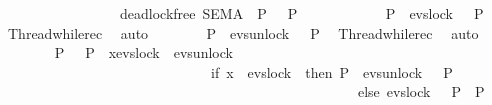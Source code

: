 \begin{isabellebody}
\ \ \ \ \ \ \ \ \ \ \ \ \ \ \ \ {\isacharparenleft}{\kern0pt}\ {\isacartoucheopen}deadlock{\isacharunderscore}{\kern0pt}free\ {\isacharparenleft}{\kern0pt}{\isacharquery}{\kern0pt}SEMA\ {\isacharbar}{\kern0pt}{\isacharbar}{\kern0pt}\ {\isacharparenleft}{\kern0pt}{\isacharquery}{\kern0pt}P{}\ \ {\isacharbar}{\kern0pt}{\isacharbar}{\kern0pt}{\isacharbar}{\kern0pt}\ {\isacharquery}{\kern0pt}P{}{\isacharparenright}{\kern0pt}{\isacharparenright}{\kern0pt}{\isacartoucheclose}{\isacharparenright}{\kern0pt}\isanewline
\ \ \isamarkupfalse%
\ {\isacharminus}{\kern0pt}\isanewline
\ \ \ \ \isamarkupfalse%
\ {}\ {\isacharcolon}{\kern0pt}\ {\isacartoucheopen}{\isacharquery}{\kern0pt}P{}\ {\isacharequal}{\kern0pt}\ evs{\isachardot}{\kern0pt}lock\ {}\ {\isasymrightarrow}\ {\isacharquery}{\kern0pt}P{}{\isacartoucheclose}\ \isamarkupfalse%
\ Thread{}{\isacharunderscore}{\kern0pt}while{\isacharunderscore}{\kern0pt}rec\ \isamarkupfalse%
\ auto\isanewline
\ \ \ \ \isamarkupfalse%
\ {}\ {\isacharcolon}{\kern0pt}\ {\isacartoucheopen}{\isacharquery}{\kern0pt}P{}\ {\isacharequal}{\kern0pt}\ evs{\isachardot}{\kern0pt}unlock\ {}\ {\isasymrightarrow}\ {\isacharquery}{\kern0pt}P{}{\isacartoucheclose}\ \isamarkupfalse%
\ Thread{}{\isacharunderscore}{\kern0pt}while{\isacharunderscore}{\kern0pt}rec\ \isamarkupfalse%
\ auto\isanewline
\ \ \ \ \isamarkupfalse%
\ {}\ {\isacharcolon}{\kern0pt}\ {\isacartoucheopen}{\isacharquery}{\kern0pt}P{}\ \ {\isacharbar}{\kern0pt}{\isacharbar}{\kern0pt}{\isacharbar}{\kern0pt}\ {\isacharquery}{\kern0pt}P{}\ {\isacharequal}{\kern0pt}\ {\isasymbox}x{\isasymin}{\isacharbraceleft}{\kern0pt}evs{\isachardot}{\kern0pt}lock\ {}{\isacharcomma}{\kern0pt}\ evs{\isachardot}{\kern0pt}unlock\ {}{\isacharbraceright}{\kern0pt}\isanewline
\ \ \ \ \ \ \ \ \ \ \ \ \ \ \ \ \ \ \ \ \ \ \ \ \ \ \ \ \ {\isasymrightarrow}\ {\isacharparenleft}{\kern0pt}if\ x\ {\isacharequal}{\kern0pt}\ evs{\isachardot}{\kern0pt}lock\ {}\ then\ {\isacharquery}{\kern0pt}P{}\ {\isacharbar}{\kern0pt}{\isacharbar}{\kern0pt}{\isacharbar}{\kern0pt}\ evs{\isachardot}{\kern0pt}unlock\ {}\ {\isasymrightarrow}\ {\isacharquery}{\kern0pt}P{}\isanewline
\ \ \ \ \ \ \ \ \ \ \ \ \ \ \ \ \ \ \ \ \ \ \ \ \ \ \ \ \ \ \ \ \ \ \ \ \ \ \ \ \ \ \ \ \ \ \ \ \ \ \ else\ evs{\isachardot}{\kern0pt}lock\ {}\ {\isasymrightarrow}\ {\isacharquery}{\kern0pt}P{}\ {\isacharbar}{\kern0pt}{\isacharbar}{\kern0pt}{\isacharbar}{\kern0pt}\ {\isacharquery}{\kern0pt}P{}{\isacharparenright}{\kern0pt}{\isacartoucheclose}\isanewline

\end{isabellebody}
